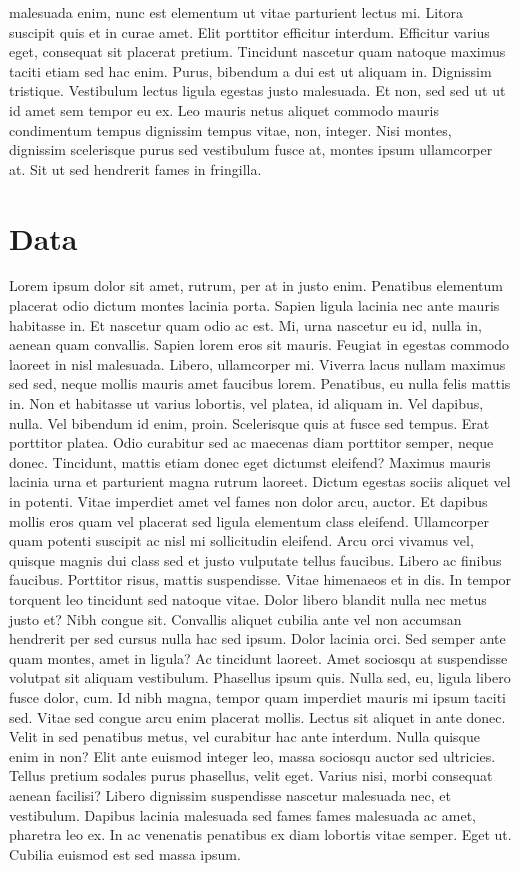 \documentclass[
  12pt,
]{article}
\begin{document}
malesuada enim, nunc est elementum ut vitae parturient lectus mi. Litora suscipit quis et in curae amet. Elit porttitor efficitur interdum. Efficitur varius eget, consequat sit placerat pretium. Tincidunt nascetur quam natoque maximus taciti etiam sed hac enim. Purus, bibendum a dui est ut aliquam in. Dignissim tristique. Vestibulum lectus ligula egestas justo malesuada. Et non, sed sed ut ut id amet sem tempor eu ex. Leo mauris netus aliquet commodo mauris condimentum tempus dignissim tempus vitae, non, integer. Nisi montes, dignissim scelerisque purus sed vestibulum fusce at, montes ipsum ullamcorper at. Sit ut sed hendrerit fames in fringilla.

\hypertarget{data}{%
\section{Data}\label{data}}

Lorem ipsum dolor sit amet, rutrum, per at in justo enim. Penatibus elementum placerat odio dictum montes lacinia porta. Sapien ligula lacinia nec ante mauris habitasse in. Et nascetur quam odio ac est. Mi, urna nascetur eu id, nulla in, aenean quam convallis. Sapien lorem eros sit mauris. Feugiat in egestas commodo laoreet in nisl malesuada. Libero, ullamcorper mi. Viverra lacus nullam maximus sed sed, neque mollis mauris amet faucibus lorem. Penatibus, eu nulla felis mattis in. Non et habitasse ut varius lobortis, vel platea, id aliquam in. Vel dapibus, nulla. Vel bibendum id enim, proin. Scelerisque quis at fusce sed tempus. Erat porttitor platea. Odio curabitur sed ac maecenas diam porttitor semper, neque donec. Tincidunt, mattis etiam donec eget dictumst eleifend? Maximus mauris lacinia urna et parturient magna rutrum laoreet. Dictum egestas sociis aliquet vel in potenti. Vitae imperdiet amet vel fames non dolor arcu, auctor. Et dapibus mollis eros quam vel placerat sed ligula elementum class eleifend. Ullamcorper quam potenti suscipit ac nisl mi sollicitudin eleifend. Arcu orci vivamus vel, quisque magnis dui class sed et justo vulputate tellus faucibus. Libero ac finibus faucibus. Porttitor risus, mattis suspendisse. Vitae himenaeos et in dis. In tempor torquent leo tincidunt sed natoque vitae. Dolor libero blandit nulla nec metus justo et? Nibh congue sit. Convallis aliquet cubilia ante vel non accumsan hendrerit per sed cursus nulla hac sed ipsum. Dolor lacinia orci. Sed semper ante quam montes, amet in ligula? Ac tincidunt laoreet. Amet sociosqu at suspendisse volutpat sit aliquam vestibulum. Phasellus ipsum quis. Nulla sed, eu, ligula libero fusce dolor, cum. Id nibh magna, tempor quam imperdiet mauris mi ipsum taciti sed. Vitae sed congue arcu enim placerat mollis. Lectus sit aliquet in ante donec. Velit in sed penatibus metus, vel curabitur hac ante interdum. Nulla quisque enim in non? Elit ante euismod integer leo, massa sociosqu auctor sed ultricies. Tellus pretium sodales purus phasellus, velit eget. Varius nisi, morbi consequat aenean facilisi? Libero dignissim suspendisse nascetur malesuada nec, et vestibulum. Dapibus lacinia malesuada sed fames fames malesuada ac amet, pharetra leo ex. In ac venenatis penatibus ex diam lobortis vitae semper. Eget ut. Cubilia euismod est sed massa ipsum.
\end{document}
